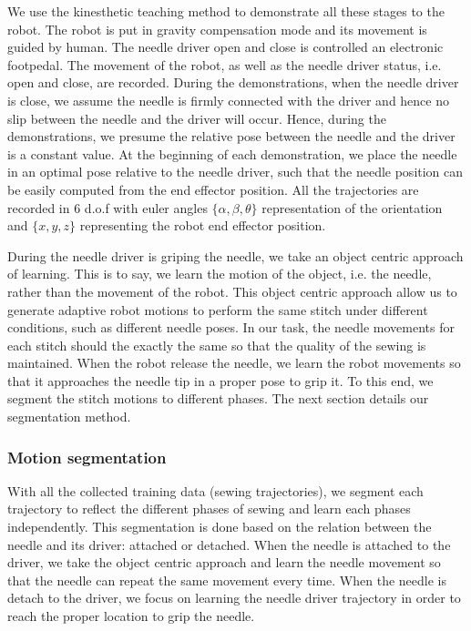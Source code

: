 We use the kinesthetic teaching method to demonstrate all these stages to the robot. The robot is put in gravity compensation mode and its movement is guided by human. The needle driver open and close is controlled an electronic footpedal. The movement of the robot, as well as the needle driver status, i.e. open and close, are recorded. During the demonstrations, when the needle driver is close, we assume the needle is firmly connected with the driver and hence no slip between the needle and the driver will occur. Hence, during the demonstrations, we presume the relative pose between the needle and the driver is a constant value. At the beginning of each demonstration, we place the needle in an optimal pose relative to the needle driver, such that the needle position can be easily computed from the end effector position.
All the trajectories are recorded in 6 d.o.f with euler angles $\{\alpha, \beta, \theta\}$ representation of the orientation and $\{x, y, z\}$ representing the robot end effector position.

During the needle driver is griping the needle, we take an object centric approach of learning. This is to say, we learn the motion of the object, i.e. the needle, rather than the movement of the robot. This object centric approach allow us to generate adaptive robot motions to perform the same stitch under different conditions, such as different needle poses. In our task, the needle movements for each stitch should the exactly the same so that the quality of the sewing is maintained. When the robot release the needle, we learn the robot movements so that it approaches the needle tip in a proper pose to grip it. To this end, we segment the stitch motions to different phases. The next section details our segmentation method.





\subsubsection{Motion segmentation}
With all the collected training data (sewing trajectories), we segment each trajectory to reflect the different phases of sewing and learn each phases independently. This segmentation is done based on the relation between the needle and its driver: attached or detached. When the needle is attached to the driver, we take the object centric approach and learn the needle movement so that the needle can repeat the same movement every time. When the needle is detach to the driver, we focus on learning the needle driver trajectory in order to reach the proper location to grip the needle.

